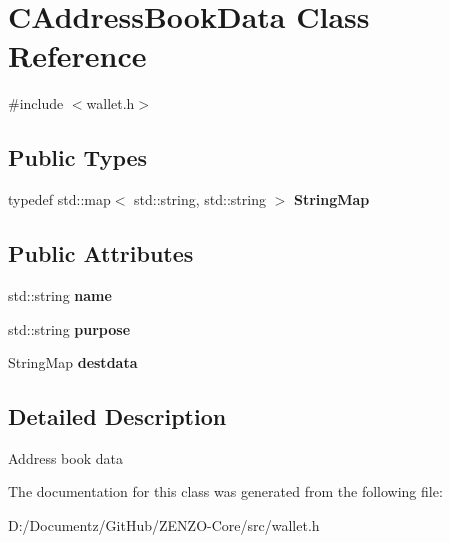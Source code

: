 \hypertarget{class_c_address_book_data}{}\section{C\+Address\+Book\+Data Class Reference}
\label{class_c_address_book_data}


{\ttfamily \#include $<$wallet.\+h$>$}

\subsection*{Public Types}
\begin{DoxyCompactItemize}
\item 
\mbox{\label{class_c_address_book_data_ad270ca7f553822b66a5b9e5f865d128f}} 
typedef std\+::map$<$ std\+::string, std\+::string $>$ {\bfseries String\+Map}
\end{DoxyCompactItemize}
\subsection*{Public Attributes}
\begin{DoxyCompactItemize}
\item 
\mbox{\label{class_c_address_book_data_a64dc6918c154b7ce75e92100804e490a}} 
std\+::string {\bfseries name}
\item 
\mbox{\label{class_c_address_book_data_ae5fece7c73830859076950851eba04e8}} 
std\+::string {\bfseries purpose}
\item 
\mbox{\label{class_c_address_book_data_a772804ca9cd2645d67a8e26b273e831c}} 
String\+Map {\bfseries destdata}
\end{DoxyCompactItemize}


\subsection{Detailed Description}
Address book data 

The documentation for this class was generated from the following file\+:\begin{DoxyCompactItemize}
\item 
D\+:/\+Documentz/\+Git\+Hub/\+Z\+E\+N\+Z\+O-\/\+Core/src/wallet.\+h\end{DoxyCompactItemize}
